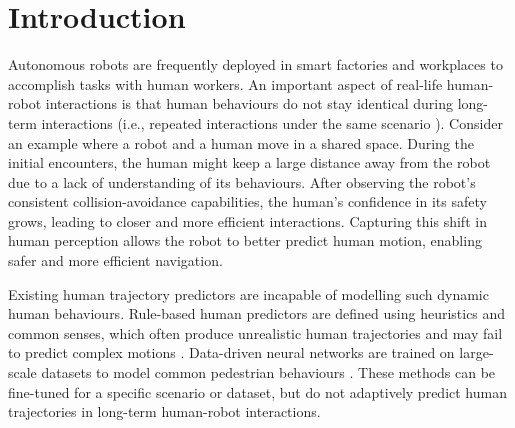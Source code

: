 \section{Introduction}

Autonomous robots are frequently deployed in smart factories and workplaces to accomplish tasks with human workers. An important aspect of real-life human-robot interactions is that human behaviours do not stay identical during long-term interactions (i.e., repeated interactions under the same scenario \cite{sagheb2023towards}). 
Consider an example where a robot and a human move in a shared space. During the initial encounters, the human might keep a large distance away from the robot due to a lack of understanding of its behaviours. 
After observing the robot's consistent collision-avoidance capabilities, the human's confidence in its safety grows, leading to closer and more efficient interactions. 
Capturing this shift in human perception allows the robot to better predict human motion, enabling safer and more efficient navigation.

Existing human trajectory predictors are incapable of modelling such dynamic human behaviours. Rule-based human predictors are defined using heuristics and common senses, 
which often produce unrealistic human trajectories and may fail to predict complex motions \cite{rudenko2020human, korbmacher2022review}. Data-driven neural networks are trained on large-scale datasets to model common pedestrian behaviours \cite{sighencea2021review}. 
These methods can be fine-tuned for a specific scenario or dataset, but do not adaptively predict human trajectories in long-term human-robot interactions.


